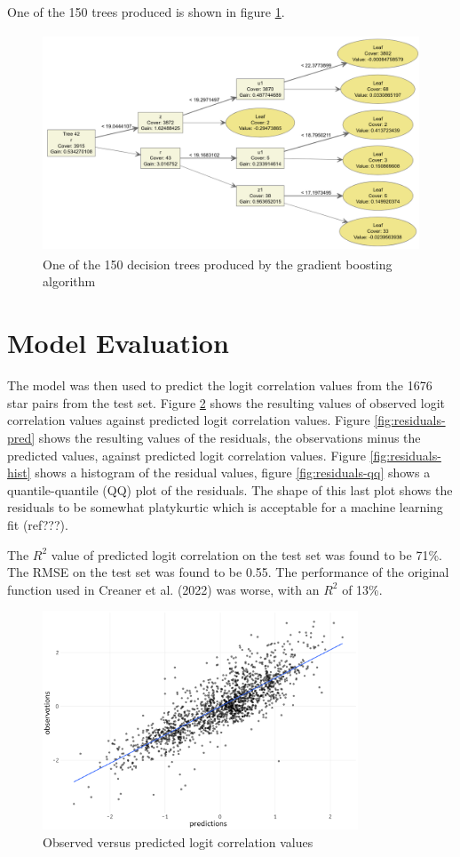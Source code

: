 \documentclass[]{elsarticle} %
\begin{document}
One of the 150 trees produced is shown in figure \ref{fig:tree}.

\begin{figure}
  \includegraphics[width=\columnwidth, height = 6.5cm]{figures/tree}
    \caption{One of the 150 decision trees produced by the gradient boosting algorithm}
    \label{fig:tree}
\end{figure}

\hypertarget{model-evaluation}{%
\section{Model Evaluation}\label{model-evaluation}}

The model was then used to predict the logit correlation values from the
1676 star pairs from the test set. Figure \ref{fig:obs-pred} shows the
resulting values of observed logit correlation values against predicted
logit correlation values. Figure \ref{fig:residuals-pred} shows the
resulting values of the residuals, the observations minus the predicted
values, against predicted logit correlation values. Figure
\ref{fig:residuals-hist} shows a histogram of the residual values,
figure \ref{fig:residuals-qq} shows a quantile-quantile (QQ) plot of the
residuals. The shape of this last plot shows the residuals to be
somewhat platykurtic which is acceptable for a machine learning fit
(ref???).

The \(R^2\) value of predicted logit correlation on the test set was
found to be 71\%. The RMSE on the test set was found to be 0.55. The
performance of the original function used in Creaner et al. (2022) was
worse, with an \(R^2\) of 13\%.

\begin{figure}
  \includegraphics[width=\columnwidth, height = 6.5cm]{figures/observed-predicted}
    \caption{Observed versus predicted logit correlation values}
    \label{fig:obs-pred}
\end{figure}
\end{document}
